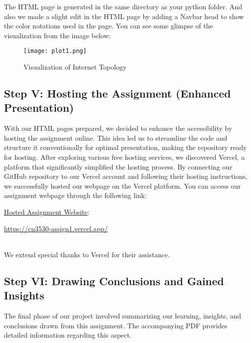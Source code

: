 \documentclass{article}
\begin{document}
The HTML page is generated in the same directory as your python folder. And also we made a slight edit in the HTML page by adding a Navbar head to show the color notations used in the page. You can see some glimpse of the visualization from the image below:
\begin{figure}[htbp]
    \centering
    \texttt{[image: plot1.png]}
    \caption{Visualization of Internet Topology}
    \label{fig:visualization}
\end{figure}


\subsection{Step V: Hosting the Assignment (Enhanced Presentation)}

With our HTML pages prepared, we decided to enhance the accessibility by hosting the assignment online. This idea led us to streamline the code and structure it conventionally for optimal presentation, making the repository ready for hosting. After exploring various free hosting services, we discovered Vercel, a platform that significantly simplified the hosting process. By connecting our GitHub repository to our Vercel account and following their hosting instructions, we successfully hosted our webpage on the Vercel platform. You can access our assignment webpage through the following link:\\
{\color{blue}
\href{https://cn3530-assign1.vercel.app/}{Hosted Assignment Website}:

\url{https://cn3530-assign1.vercel.app/}}
\\
We extend special thanks to Vercel for their assistance.

\subsection{Step VI: Drawing Conclusions and Gained Insights}

The final phase of our project involved summarizing our learning, insights, and conclusions drawn from this assignment. The accompanying PDF provides detailed information regarding this aspect.
\end{document}
